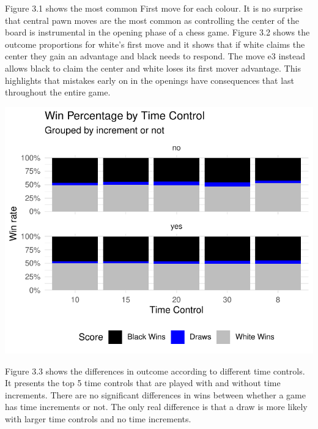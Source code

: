 \documentclass[12pt,preprint, authoryear]{elsarticle}
\let\origfigure\figure
\let\endorigfigure\endfigure
\renewenvironment{figure}[1][2] {
    \expandafter\origfigure\expandafter[H]
} {
    \endorigfigure
}
\numberwithin{equation}{section}
\numberwithin{figure}{section}
\numberwithin{table}{section}
\begin{document}
Figure 3.1 shows the most common First move for each colour. It is no
surprise that central pawn moves are the most common as controlling the
center of the board is instrumental in the opening phase of a chess
game. Figure 3.2 shows the outcome proportions for white's first move
and it shows that if white claims the center they gain an advantage and
black needs to respond. The move e3 instead allows black to claim the
center and white loses its first mover advantage. This highlights that
mistakes early on in the openings have consequences that last throughout
the entire game.

\begin{figure}[H]

{\centering \includegraphics{WriteUp_files/figure-latex/Descript3wins-1} 

}

\caption{Outcomes by Time Controls\label{Figure3}}\label{fig:Descript3wins}
\end{figure}

Figure 3.3 shows the differences in outcome according to different time
controls. It presents the top 5 time controls that are played with and
without time increments. There are no significant differences in wins
between whether a game has time increments or not. The only real
difference is that a draw is more likely with larger time controls and
no time increments.
\end{document}
